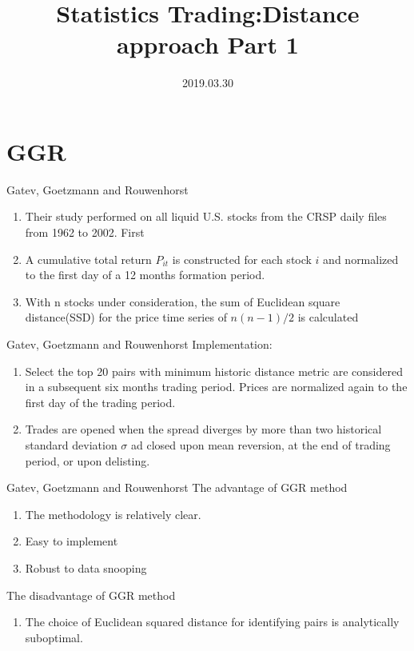 \documentclass{beamer}
\title[Introduction]{Statistics Trading:Distance approach Part 1}
\author{}
\institute{}
\date{2019.03.30}
\begin{document}
\begin{frame}
  \titlepage
\end{frame}

\section{GGR}
\begin{frame}{Gatev, Goetzmann and Rouwenhorst}
	\begin{enumerate}
		\item Their study performed on all liquid U.S. stocks from the CRSP daily files from 1962 to 2002. First 
		\item A cumulative total return $P_{it}$ is constructed for each stock $i$ and normalized to the first day of a 12 months formation period.
		\item With n stocks under consideration, the sum of Euclidean square distance(SSD) for the price time series of $n(n-1)/2$ is calculated 
	\end{enumerate}
\end{frame}
\begin{frame}{Gatev, Goetzmann and Rouwenhorst}
	Implementation:
	\begin{enumerate}
		\item Select the top 20 pairs with minimum historic distance metric are considered in a subsequent six months trading period. Prices are normalized again to the first day of the trading period.
		\item Trades are opened when the spread diverges by more than two historical standard deviation $\sigma$ ad closed upon mean reversion, at the end of trading period, or upon delisting.
	\end{enumerate}
\end{frame}
\begin{frame}{Gatev, Goetzmann and Rouwenhorst}
	The advantage of GGR method
	\begin{enumerate}
		\item The methodology is relatively clear.
		\item Easy to implement
		\item Robust to data snooping 
	\end{enumerate}
	The disadvantage of GGR method
	\begin{enumerate}
		\item The choice of Euclidean squared distance for identifying pairs is analytically suboptimal.
	\end{enumerate}
\end{frame}
\end{document}
